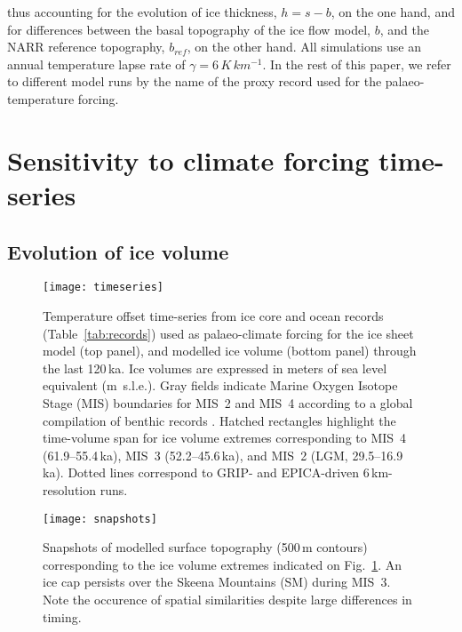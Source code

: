 \documentclass[tc]{copernicus}
\begin{document}
thus accounting for the evolution of ice thickness, ${h=s-b}$,
on the one hand, and for differences between the basal topography of the ice
flow model, $b$, and the
NARR reference topography, $b_{ref}$, on the other hand. All simulations use an
annual temperature lapse rate of $\gamma = 6\,\unit{K\,km^{-1}}$.
In the rest of this paper, we refer to different model runs by the name of the
proxy record used for the palaeo-temperature forcing.

\section{Sensitivity to climate forcing time-series}
\label{sec:results}

\subsection{Evolution of ice volume}

\begin{figure*}
  \texttt{[image: timeseries]}
  \caption{Temperature offset time-series from ice core and ocean records
           (Table~\ref{tab:records}) used as palaeo-climate forcing for the ice
           sheet model (top panel), and modelled ice volume (bottom panel)
           through the last 120\,ka. Ice volumes are expressed in meters of sea
           level equivalent (m~s.l.e.). Gray fields indicate Marine Oxygen
           Isotope Stage (MIS) boundaries for MIS~2 and MIS~4 according to a
           global compilation of benthic  records
           \citep{Lisiecki.Raymo.2005}. Hatched rectangles highlight the
           time-volume span for ice volume extremes corresponding to MIS~4
           (61.9--55.4\,ka), MIS~3 (52.2--45.6\,ka), and MIS~2 (LGM,
           29.5--16.9\,ka). Dotted lines correspond to GRIP- and EPICA-driven
           6\,km-resolution runs.}
  \label{fig:timeseries}
\end{figure*}

\begin{figure*}
  \texttt{[image: snapshots]}
  \caption{Snapshots of modelled surface topography (500\,m contours)
           corresponding to the ice volume extremes indicated on
           Fig.~\ref{fig:timeseries}. An ice cap persists over the Skeena
           Mountains (SM) during MIS~3. Note the occurence of spatial
           similarities despite large differences in timing.}
  \label{fig:snapshots}
\end{figure*}
\end{document}
